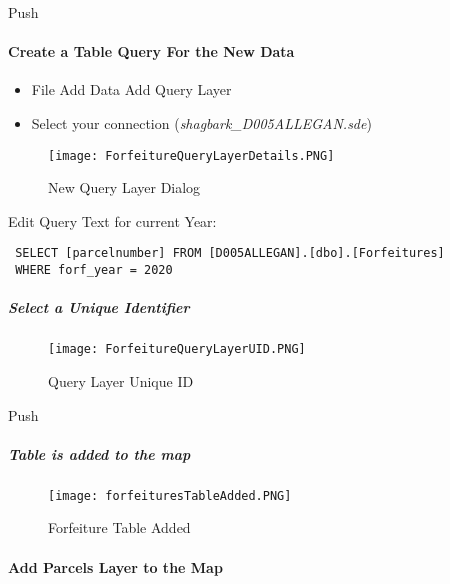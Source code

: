  \vspace{.15in}

{\bigbtn Push }

\clearpage




 
 \paragraph{Create a Table Query For the New Data}

 \begin{itemize}
 \item {File {\menuArrow} Add Data {\menuArrow} Add Query Layer}
 \item {{ Select your connection} (\textit{shagbark\_D005ALLEGAN.sde})}
 \end{itemize}
 \begin{figure}[h!]
 \centering
     \texttt{[image: ForfeitureQueryLayerDetails.PNG]}
 \caption{New Query Layer Dialog}
 \end{figure}
\vspace{.1in}
Edit Query Text for current Year:
\vspace{.1in}
 \begin{verbatim}
 SELECT [parcelnumber] FROM [D005ALLEGAN].[dbo].[Forfeitures]
 WHERE forf_year = 2020
 \end{verbatim}
 \subparagraph{Select a Unique Identifier}
 \begin{figure}[h!]
 \centering
     \texttt{[image: ForfeitureQueryLayerUID.PNG]}
 \caption{Query Layer Unique ID}
 \end{figure}
{\bigbtn Push }

 \clearpage
 \subparagraph*{Table is added to the map}
 \begin{figure}[h!]
 \centering
     \texttt{[image: forfeituresTableAdded.PNG]}
 \caption{Forfeiture Table Added}
 \end{figure}
 \clearpage
 \paragraph{Add Parcels Layer to the Map}

